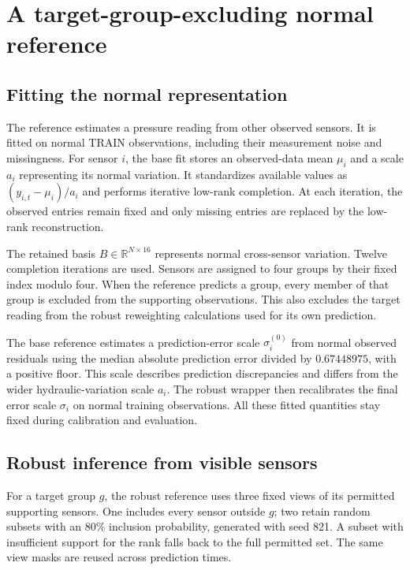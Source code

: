 \section{A target-group-excluding normal reference}
\subsection{Fitting the normal representation}
The reference estimates a pressure reading from other observed sensors. It is fitted on normal TRAIN observations, including their measurement noise and missingness. For sensor $i$, the base fit stores an observed-data mean $\mu_i$ and a scale $a_i$ representing its normal variation. It standardizes available values as $(y_{i,t}-\mu_i)/a_i$ and performs iterative low-rank completion. At each iteration, the observed entries remain fixed and only missing entries are replaced by the low-rank reconstruction.

The retained basis $B\in\mathbb R^{N\times16}$ represents normal cross-sensor variation. Twelve completion iterations are used. Sensors are assigned to four groups by their fixed index modulo four. When the reference predicts a group, every member of that group is excluded from the supporting observations. This also excludes the target reading from the robust reweighting calculations used for its own prediction.

The base reference estimates a prediction-error scale $\sigma_i^{(0)}$ from normal observed residuals using the median absolute prediction error divided by $0.67448975$, with a positive floor. This scale describes prediction discrepancies and differs from the wider hydraulic-variation scale $a_i$. The robust wrapper then recalibrates the final error scale $\sigma_i$ on normal training observations. All these fitted quantities stay fixed during calibration and evaluation.

\subsection{Robust inference from visible sensors}
For a target group $g$, the robust reference uses three fixed views of its permitted supporting sensors. One includes every sensor outside $g$; two retain random subsets with an 80\% inclusion probability, generated with seed 821. A subset with insufficient support for the rank falls back to the full permitted set. The same view masks are reused across prediction times.

